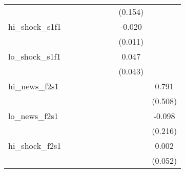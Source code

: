{\begin{tabular}{l*{8}{c}}
            &                     &                     &                     &                     &                     &                     &     (0.154)         &                     \\
\addlinespace
hi\_shock\_s1f1&                     &                     &                     &                     &                     &                     &      -0.020\sym{*}  &                     \\
            &                     &                     &                     &                     &                     &                     &     (0.011)         &                     \\
\addlinespace
lo\_shock\_s1f1&                     &                     &                     &                     &                     &                     &       0.047         &                     \\
            &                     &                     &                     &                     &                     &                     &     (0.043)         &                     \\
\addlinespace
hi\_news\_f2s1&                     &                     &                     &                     &                     &                     &                     &       0.791         \\
            &                     &                     &                     &                     &                     &                     &                     &     (0.508)         \\
\addlinespace
lo\_news\_f2s1&                     &                     &                     &                     &                     &                     &                     &      -0.098         \\
            &                     &                     &                     &                     &                     &                     &                     &     (0.216)         \\
\addlinespace
hi\_shock\_f2s1&                     &                     &                     &                     &                     &                     &                     &       0.002         \\
            &                     &                     &                     &                     &                     &                     &                     &     (0.052)         \\

\end{tabular}}
